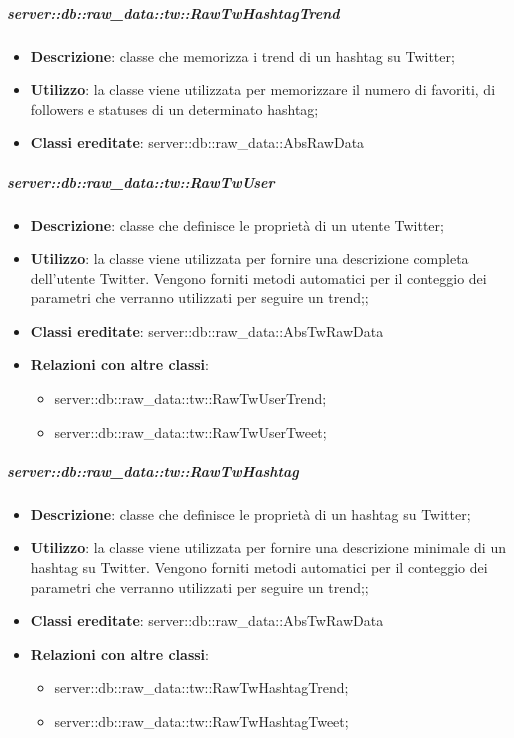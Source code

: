 		\subparagraph{server::db::raw\_data::tw::RawTwHashtagTrend} %
		\label{subp:server_db_raw_data_tw_rawighashtagtrend}
			\begin{itemize}
				\item \textbf{Descrizione}: classe che memorizza i trend di un hashtag su Twitter;
				\item \textbf{Utilizzo}: la classe viene utilizzata per memorizzare il numero di favoriti, di followers e statuses di un determinato hashtag;
				\item \textbf{Classi ereditate}: server::db::raw\_data::AbsRawData
			\end{itemize}


		\subparagraph{server::db::raw\_data::tw::RawTwUser} %
		\label{subp:server_db_raw_data_tw_rawtwuser}
			\begin{itemize}
				\item \textbf{Descrizione}: classe che definisce le proprietà di un utente Twitter;
				\item \textbf{Utilizzo}: la classe viene utilizzata per fornire una descrizione completa dell'utente Twitter. Vengono forniti metodi automatici per il conteggio dei parametri che verranno utilizzati per seguire un trend;;
				\item \textbf{Classi ereditate}: server::db::raw\_data::AbsTwRawData
				\item \textbf{Relazioni con altre classi}:
					\begin{itemize}
						\item server::db::raw\_data::tw::RawTwUserTrend;
						\item server::db::raw\_data::tw::RawTwUserTweet;
					\end{itemize}
			\end{itemize}


		\subparagraph{server::db::raw\_data::tw::RawTwHashtag} %
		\label{subp:server_db_raw_data_tw_rawtwhashtag}
			\begin{itemize}
				\item \textbf{Descrizione}: classe che definisce le proprietà di un hashtag su Twitter;
				\item \textbf{Utilizzo}: la classe viene utilizzata per fornire una descrizione minimale di un hashtag su Twitter. Vengono forniti metodi automatici per il conteggio dei parametri che verranno utilizzati per seguire un trend;;
				\item \textbf{Classi ereditate}: server::db::raw\_data::AbsTwRawData
				\item \textbf{Relazioni con altre classi}:
					\begin{itemize}
						\item server::db::raw\_data::tw::RawTwHashtagTrend;
						\item server::db::raw\_data::tw::RawTwHashtagTweet;
					\end{itemize}
			\end{itemize}



